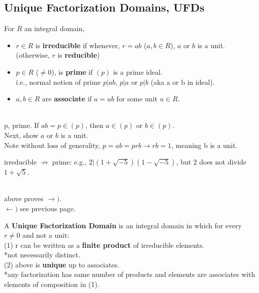 \documentclass[12pt]{article}
\begin{document}
\subsection*{Unique Factorization Domains, UFDs}

For $R$ an integral domain, 
\begin{itemize}
    \item $r \in R$ is \textbf{irreducible} if whenever, $r=ab$ ($a, b \in R$), $a$ or $b$ is a unit. (otherwise, $r$ is \textbf{reducible})
    \item $p \in R$ ($\neq 0$), is \textbf{prime} if $(p)$ is a prime ideal. \\
    i.e., normal notion of prime $p | ab$, $p | a$ or $p | b$ (aka a or b in ideal).
    \item $a, b \in R$ are \textbf{associate} if $a = ub$ for some unit $u \in R$.
\end{itemize}

\centerline{}\\
\textcolor[gray]{0.5}{p, prime. 
If $ab = p \in (p)$, then $a \in (p)$ or $b \in (p)$.\\
Next, show $a$ or $b$ is a unit. \\
Note without loss of generality, $p = ab = prb \rightarrow rb = 1$, meaning b is a unit. \\
}

irreducible $\not \rightarrow$ prime: e.g., $2 | (1 + \sqrt{-5})(1- \sqrt{-5})$, but $2$ does not divide $1+\sqrt{5}$.\\

\centerline{}\\
\textcolor[gray]{0.5}{above proves $\rightarrow)$. \\
$\leftarrow)$ see previous page.
}



A \textbf{Unique Factorization Domain} is an integral domain in which for every $r \neq 0$ and not a unit:\\
(1) r can be written as a \textbf{finite product} of irreducible elements. \\
    *not necessarily distinct.\\
(2) above is \textbf{unique} up to associates.\\
    *any factorization has same number of products and elements are associates with elements of composition in (1).\\
\end{document}
